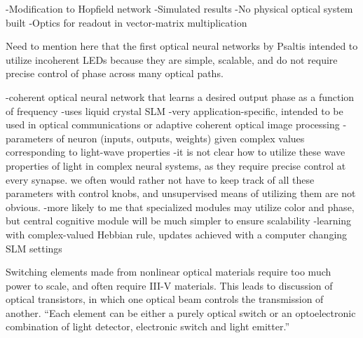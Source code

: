 \vspace{3em}
\cite{maar1987}
-Modification to Hopfield network
-Simulated results
-No physical optical system built
-Optics for readout in vector-matrix multiplication

\cite{safi1995}


\vspace{3em}
Need to mention here that the first optical neural networks by Psaltis intended to utilize incoherent LEDs because they are simple, scalable, and do not require precise control of phase across many optical paths.

\cite{kahi2003}
-coherent optical neural network that learns a desired output phase as a function of frequency
-uses liquid crystal SLM
-very application-specific, intended to be used in optical communications or adaptive coherent optical image processing
-parameters of neuron (inputs, outputs, weights) given complex values corresponding to light-wave properties
-it is not clear how to utilize these wave properties of light in complex neural systems, as they require precise control at every synapse. we often would rather not have to keep track of all these parameters with control knobs, and unsupervised means of utilizing them are not obvious.
-more likely to me that specialized modules may utilize color and phase, but central cognitive module will be much simpler to ensure scalability
-learning with complex-valued Hebbian rule, updates achieved with a computer changing SLM settings

\vspace{3em}
Switching elements made from nonlinear optical materials require too much power to scale, and often require III-V materials. This leads to discussion of optical transistors, in which one optical beam controls the transmission of another. ``Each element can be either a purely optical switch or an optoelectronic combination of light detector, electronic switch and light emitter.'' \cite{abps1987}


